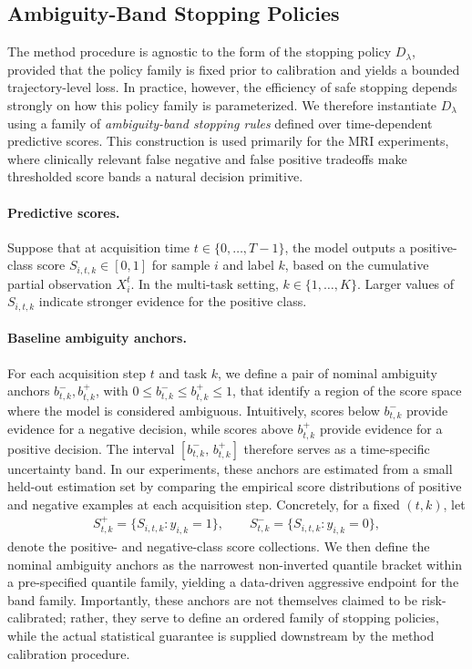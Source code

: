 \subsection{Ambiguity-Band Stopping Policies}
\label{app:ambiguity_bands}

The \gls{method} procedure is agnostic to the form of the stopping policy $D_\lambda$, provided that the policy family is fixed prior to calibration and yields a bounded trajectory-level loss. In practice, however, the efficiency of safe stopping depends strongly on how this policy family is parameterized. We therefore instantiate $D_\lambda$ using a family of \emph{ambiguity-band stopping rules} defined over time-dependent predictive scores. This construction is used primarily for the MRI experiments, where clinically relevant false negative and false positive tradeoffs make thresholded score bands a natural decision primitive.

\paragraph{Predictive scores.}
Suppose that at acquisition time $t\in\{0,\dots,T-1\}$, the model outputs a positive-class score $S_{i,t,k}\in[0,1]$ for sample $i$ and label $k$, based on the cumulative partial observation $X_i^t$. In the multi-task setting, $k\in\{1,\dots,K\}$. Larger values of $S_{i,t,k}$ indicate stronger evidence for the positive class.

\paragraph{Baseline ambiguity anchors.}
For each acquisition step $t$ and task $k$, we define a pair of nominal ambiguity anchors $b^-_{t,k}, b^+_{t,k}$, with $0\le b^-_{t,k}\le b^+_{t,k}\le 1$, that identify a region of the score space where the model is considered ambiguous. Intuitively, scores below $b^-_{t,k}$ provide evidence for a negative decision, while scores above $b^+_{t,k}$ provide evidence for a positive decision. The interval $[b^-_{t,k},\, b^+_{t,k}]$ therefore serves as a time-specific uncertainty band. In our experiments, these anchors are estimated from a small held-out estimation set by comparing the empirical score distributions of positive and negative examples at each acquisition step. Concretely, for a fixed $(t,k)$, let
\begin{align*}
S^+_{t,k}=\{S_{i,t,k}: y_{i,k}=1\},
\qquad
S^-_{t,k}=\{S_{i,t,k}: y_{i,k}=0\},
\end{align*}
denote the positive- and negative-class score collections. We then define the nominal ambiguity anchors as the narrowest non-inverted quantile bracket within a pre-specified quantile family, yielding a data-driven aggressive endpoint for the band family. Importantly, these anchors are not themselves claimed to be risk-calibrated; rather, they serve to define an ordered family of stopping policies, while the actual statistical guarantee is supplied downstream by the \gls{method} calibration procedure.

